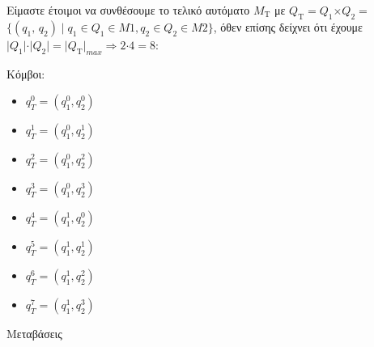\hfill \break
\par
Είμαστε έτοιμοι να συνθέσουμε το τελικό αυτόματο $M_{\text{Τ}}$ με $Q_{\text{Τ}} = Q_{1} \bm{\times} Q_{2}
=$\\ $\{(q_1,\, q_2) \;\vert\; q_1 \in Q_1 \in M1, q_2 \in Q_2 \in M2\}$, όθεν επίσης δείχνει ότι έχουμε\\ $\vert
Q_{1}\vert \bm{\cdot} \vert Q_{2}\vert = \vert
Q_{\text{Τ}}\vert_{max} \Longrightarrow 2\bm{\cdot} 4 = 8$:
\clearpage

Κόμβοι:
\reducevspace\reducevspace\reducevspace\reducevspace\reducevspace\reducevspace\reducevspace
\begin{multicols}{4}
\begin{itemize}
	\itemsep0em
	\item $q_T^{0} = (q_1^{0}, q_2^{0})$
	\item $q_T^{1} = (q_1^{0}, q_2^{1})$

	\item $q_T^{2} = (q_1^{0}, q_2^{2})$
	\item $q_T^{3} = (q_1^{0}, q_2^{3})$

	\item $q_T^{4} = (q_1^{1}, q_2^{0})$
	\item $q_T^{5} = (q_1^{1}, q_2^{1})$

	\item $q_T^{6} = (q_1^{1}, q_2^{2})$
	\item $q_T^{7} = (q_1^{1}, q_2^{3})$
\end{itemize}
\end{multicols}
\reducevspace\reducevspace\reducevspace\reducevspace\reducevspace\reducevspace\reducevspace
\par Μεταβάσεις
\reducevspace\reducevspace\reducevspace\reducevspace\reducevspace\reducevspace\reducevspace
